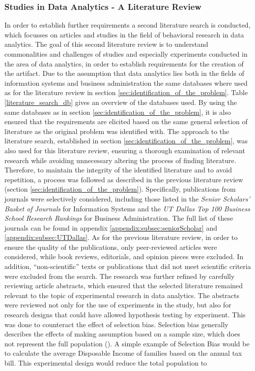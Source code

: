 \subsubsection{Studies in Data Analytics - A Literature Review }\label{subsec:literature_review_requirements}

In order to establish further requirements a second literature search is conducted, which focusses on articles and studies in the field of behavioral research in data analytics. The goal of this second literature review is to understand commonalities and challenges of studies and especially experiments conducted in the area of data analytics, in order to establish requirements for the creation of the artifact. %
Due to the assumption that data analytics lies both in the fields of information systems and business administration the same databases where used as for the literature review in section \ref{sec:identification_of_the_problem}. Table \ref{literature_search_db} gives an overview of the databases used. By using the same databases as in section \ref{sec:identification_of_the_problem}, it is also ensured that the requirements are elicited based on the same general selection of literature as the original problem was identified with. The approach to the literature search, established in section \ref{sec:identification_of_the_problem}, was also used for this literature review, ensuring a thorough examination of relevant research while avoiding unnecessary altering the process of finding literature. Therefore, to maintain the integrity of the identified literature and to avoid repetition, a process was followed as described in the previous literature review (section \ref{sec:identification_of_the_problem}). Specifically, publications from journals were selectively considered, including those listed in the \textit{Senior Scholars' Basket of Journals} for Information Systems and the \textit{UT Dallas Top 100 Business School Research Rankings} for Business Administration. The full list of these journals can be found in appendix \ref{appendix:subsec:seniorScholar} and \ref{appendix:subsec:UTDallas}. As for the previous literature review, in order to ensure the quality of the publications, only peer-reviewed articles were considered, while book reviews, editorials, and opinion pieces were excluded. In addition, \enquote{non-scientific} texts or publications that did not meet scientific criteria were excluded from the search. The research was further refined by carefully reviewing article abstracts, which ensured that the selected literature remained relevant to the topic of experimental research in data analytics. The abstracts were reviewed not only for the use of experiments in the study, but also for research designs that could have allowed hypothesis testing by experiment. This was done to counteract the effect of selection bias. Selection bias generally describes the effects of making assumption based on a sample size, which does not represent the full population (\cite{Heckman.2010}). A simple example of Selection Bias would be to calculate the average Disposable Income of families based on the annual tax bill. This experimental design would reduce the total population to 